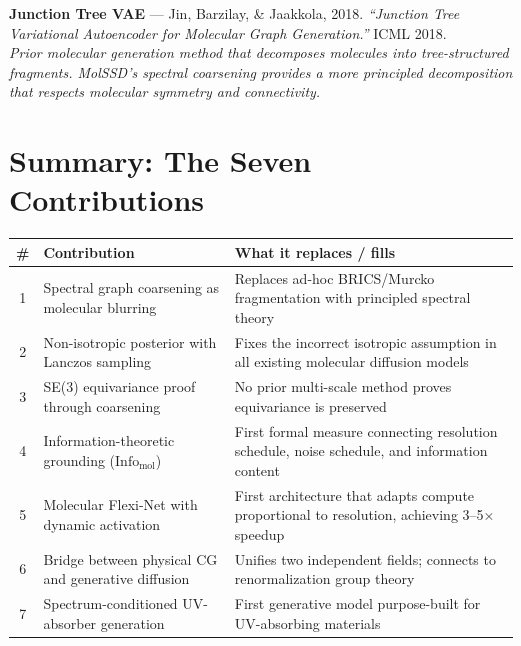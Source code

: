 \documentclass[12pt,a4paper]{article}
\begin{document}
\begin{enumerate}[leftmargin=*, label={[\arabic*]}]
\item \textbf{Junction Tree VAE} --- Jin, Barzilay, \& Jaakkola, 2018.
\textit{``Junction Tree Variational Autoencoder for Molecular Graph Generation.''}
ICML 2018.\\
\emph{Prior molecular generation method that decomposes molecules into tree-structured fragments. MolSSD's spectral coarsening provides a more principled decomposition that respects molecular symmetry and connectivity.}

\end{enumerate}


\section{Summary: The Seven Contributions}

\begin{center}
\renewcommand{\arraystretch}{1.3}
\begin{tabular}{clp{6.5cm}}
\toprule
\textbf{\#} & \textbf{Contribution} & \textbf{What it replaces / fills} \\
\midrule
1 & Spectral graph coarsening as molecular blurring & Replaces ad-hoc BRICS/Murcko fragmentation with principled spectral theory \\
2 & Non-isotropic posterior with Lanczos sampling & Fixes the incorrect isotropic assumption in all existing molecular diffusion models \\
3 & SE(3) equivariance proof through coarsening & No prior multi-scale method proves equivariance is preserved \\
4 & Information-theoretic grounding ($\text{Info}_{\text{mol}}$) & First formal measure connecting resolution schedule, noise schedule, and information content \\
5 & Molecular Flexi-Net with dynamic activation & First architecture that adapts compute proportional to resolution, achieving 3--5$\times$ speedup \\
6 & Bridge between physical CG and generative diffusion & Unifies two independent fields; connects to renormalization group theory \\
7 & Spectrum-conditioned UV-absorber generation & First generative model purpose-built for UV-absorbing materials \\
\bottomrule
\end{tabular}
\end{center}
\end{document}
